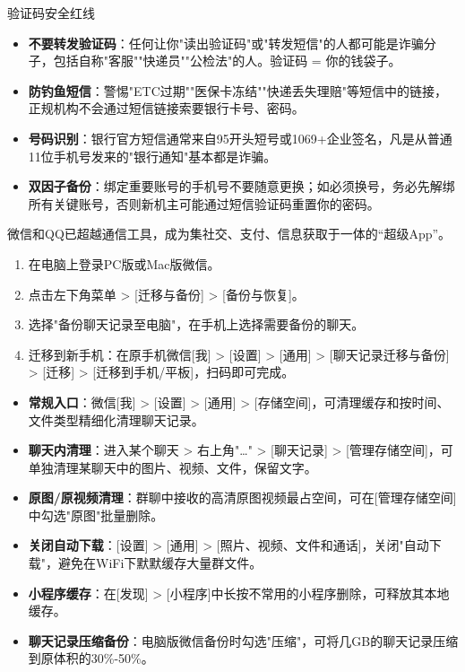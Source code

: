 \begin{tcbwarn}{验证码安全红线}
\begin{itemize}
  \item \textbf{不要转发验证码}：任何让你"读出验证码"或"转发短信"的人都可能是诈骗分子，包括自称"客服""快递员""公检法"的人。验证码 = 你的钱袋子。
  \item \textbf{防钓鱼短信}：警惕"ETC过期""医保卡冻结""快递丢失理赔"等短信中的链接，正规机构不会通过短信链接索要银行卡号、密码。
  \item \textbf{号码识别}：银行官方短信通常来自95开头短号或1069+企业签名，凡是从普通11位手机号发来的"银行通知"基本都是诈骗。
  \item \textbf{双因子备份}：绑定重要账号的手机号不要随意更换；如必须换号，务必先解绑所有关键账号，否则新机主可能通过短信验证码重置你的密码。
\end{itemize}

\end{tcbwarn}


微信和QQ已超越通信工具，成为集社交、支付、信息获取于一体的“超级App”。


\begin{enumerate}
  \item 在电脑上登录PC版或Mac版微信。
  \item 点击左下角菜单 > [迁移与备份] > [备份与恢复]。
  \item 选择"备份聊天记录至电脑"，在手机上选择需要备份的聊天。
  \item 迁移到新手机：在原手机微信[我] > [设置] > [通用] > [聊天记录迁移与备份] > [迁移] > [迁移到手机/平板]，扫码即可完成。
\end{enumerate}


\begin{itemize}
  \item \textbf{常规入口}：微信[我] > [设置] > [通用] > [存储空间]，可清理缓存和按时间、文件类型精细化清理聊天记录。
  \item \textbf{聊天内清理}：进入某个聊天 > 右上角"…" > [聊天记录] > [管理存储空间]，可单独清理某聊天中的图片、视频、文件，保留文字。
  \item \textbf{原图/原视频清理}：群聊中接收的高清原图视频最占空间，可在[管理存储空间]中勾选"原图"批量删除。
  \item \textbf{关闭自动下载}：[设置] > [通用] > [照片、视频、文件和通话]，关闭"自动下载"，避免在WiFi下默默缓存大量群文件。
  \item \textbf{小程序缓存}：在[发现] > [小程序]中长按不常用的小程序删除，可释放其本地缓存。
  \item \textbf{聊天记录压缩备份}：电脑版微信备份时勾选"压缩"，可将几GB的聊天记录压缩到原体积的30\%-50\%。
\end{itemize}

